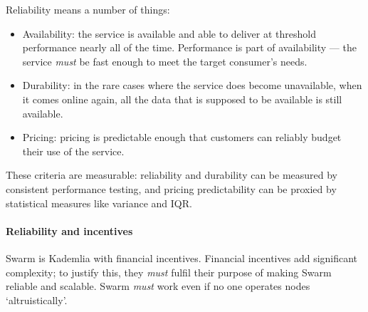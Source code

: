 Reliability means a number of things:
%
\begin{itemize}
  \item 
    Availability: the service is available and able to deliver at threshold performance nearly all of the time.
    Performance is part of availability — the service \emph{must} be fast enough to meet the target consumer's needs.
  \item 
    Durability: in the rare cases where the service does become unavailable, when it comes online again, all the data that is supposed to be available is still available.
  \item 
    Pricing: pricing is predictable enough that customers can reliably budget their use of the service.
\end{itemize}
%
These criteria are measurable: reliability and durability can be measured by consistent performance testing, and pricing predictability can be proxied by statistical measures like variance and IQR.

\paragraph{Reliability and incentives}
%
Swarm is Kademlia with financial incentives.
%
Financial incentives add significant complexity; to justify this, they \emph{must} fulfil their purpose of making Swarm reliable and scalable.
%
Swarm \emph{must} work even if no one operates nodes `altruistically'.

